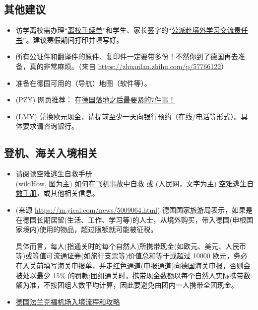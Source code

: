 \subsection{其他建议}
\begin{itemize}
  \item 访学离校需办理“\href{http://bkjy.ucas.ac.cn/index.php/fxjl/download/3401-2017-06-13-03-47-14?task=down&fid=818}{离校手续单}”和学生、家长签字的“\href{http://bkjy.ucas.ac.cn/index.php/fxjl/download/3400-2017-06-13-03-46-26?task=down&fid=701}{公派赴境外学习交流责任书}”。建议寒假期间打印并填写好。
  \item 所有公证件和翻译件的原件、复印件一定要带多份！不然你到了德国再去准备，真的非常麻烦。（来自 \url{https://zhuanlan.zhihu.com/p/57766122}）
  \item 准备在德国可用的（导航）地图（软件等）。
  \item (PZY) 网页推荐： \href{https://mp.weixin.qq.com/s?srcid=0319fCMV7x6jt2w4xgPGYSMm&scene=23&mid=2651269086&sn=2b9eff5e72b2e989ac404be9be21bc09&idx=2&__biz=MzA4NTM2MzAxNw%3D%3D&chksm=842a97f8b35d1eee47778e42c10d883071d1546d6bab41132685fd4c983a6d713ca70a9b2328&mpshare=1#rd&appinstall=0}{在德国落地之后最要紧的7件事！}
  \item (LMY) 兑换欧元现金，请提前至少一天向银行预约（在线/电话等形式）。具体要求请咨询银行。
\end{itemize}


\subsection{登机、海关入境相关}
\begin{itemize}
\item 请阅读空难逃生自救手册 \\
(wikiHow, 图为主) \href{https://zh.wikihow.com/\%E5\%9C\%A8\%E9\%A3\%9E\%E6\%9C\%BA\%E4\%BA\%8B\%E6\%95\%85\%E4\%B8\%AD\%E8\%87\%AA\%E6\%95\%91}{如何在飞机事故中自救} 或 (人民网，文字为主) \href{http://travel.people.com.cn/n/2014/0725/c41570-25344422.html}{空难逃生自救手册}，或其他相关信息。
\item (来源 \url{https://m.yicai.com/news/5009064.html}) 德国国家旅游局表示，如果是在德国长期居留(生活、工作、学习等)的人士，从境外购买，带入德国(申根国家境内)使用的物品，超过限额就可能被征税。

具体而言，每人(指通关时的每个自然人)所携带现金(如欧元、美元、人民币等)或等值可流通证券(如旅行支票等)价值总和等于或超过 10000 欧元，务必在入关前填写海关申报单，并走红色通道(申报通道)向德国海关申报，否则会被处以最少 15\% 的罚款;团组通关时，携带现金数额以每个自然人实际携带数额为准，不按团组人数平均计算，因此要避免由团内一人携带全团现金。
\item \href{https://bbs.qyer.com/thread-2850836-1.html}{德国法兰克福机场入境流程和攻略}
\end{itemize}
% 